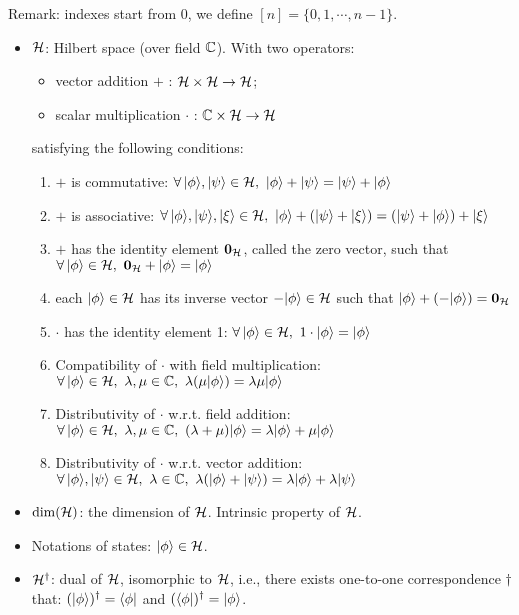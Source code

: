 Remark: indexes start from 0, we define $[n] = \{0,1,\cdots,n-1\}$.

\begin{itemize}
    \item ${\mathcal{H}}$: Hilbert space (over field ${\mathbb{C}}$). With two operators:
    \begin{itemize}
        \item vector addition $+$ : ${\mathcal{H}}\times{\mathcal{H}}\rightarrow{\mathcal{H}}$;
        \item scalar multiplication $\cdot$ : ${\mathbb{C}}\times{\mathcal{H}}\rightarrow{\mathcal{H}}$
    \end{itemize}
    satisfying the following conditions:
    \begin{enumerate}
        \item $+$ is commutative: $\forall\,|\phi\>,|\psi\>\in\cH,\ |\phi\>+|\psi\>=|\psi\>+|\phi\>$
        \item $+$ is associative: $\forall\,|\phi\>,|\psi\>,|\xi\>\in\cH,\ |\phi\>+(|\psi\>+|\xi\>)=(|\psi\>+|\phi\>)+|\xi\>$
        \item $+$ has the identity element ${\mathbf{0}_{{\mathcal{H}}}}$, called the zero vector, such that $\forall\,|\phi\rangle\in{\mathcal{H}},\ {\mathbf{0}_{{\mathcal{H}}}} + |\phi\rangle = |\phi\rangle$
        \item each $|\phi\rangle\in{\mathcal{H}}$ has its inverse vector $-|\phi\rangle\in{\mathcal{H}}$ such that $|\phi\rangle + (-|\phi\rangle) = {\mathbf{0}_{{\mathcal{H}}}}$
        \item $\cdot$ has the identity element 1: $\forall\,|\phi\rangle\in{\mathcal{H}},\ 1\cdot|\phi\rangle = |\phi\rangle$
        \item Compatibility of $\cdot$ with field multiplication: $\forall\,|\phi\>\in\cH,\ \lambda,\mu\in\complexnumber,\ \lambda(\mu|\phi\>) = \lambda\mu|\phi\>$
        \item Distributivity of $\cdot$ w.r.t. field addition: $\forall\,|\phi\>\in\cH,\ \lambda,\mu\in\complexnumber,\ (\lambda + \mu)|\phi\> = \lambda|\phi\> + \mu|\phi\>$
        \item Distributivity of $\cdot$ w.r.t. vector addition: $\forall\,|\phi\>,|\psi\>\in\cH,\ \lambda\in\complexnumber,\ \lambda(|\phi\>+|\psi\>) = \lambda|\phi\> + \lambda|\psi\>$
    \end{enumerate}

    \item $\dim({\mathcal{H}})$: the dimension of ${\mathcal{H}}$. Intrinsic property of ${\mathcal{H}}$.
    \item Notations of states: $|\phi\rangle\in{\mathcal{H}}$. 
    
    \item ${\mathcal{H}}^\dag$: dual of ${\mathcal{H}}$, isomorphic to ${\mathcal{H}}$, i.e., there exists one-to-one correspondence $\dag$ that: $(|\phi\rangle)^\dag = \langle\phi|$ and 
    $(\langle\phi|)^\dag = |\phi\rangle$. 
    

\end{itemize}
